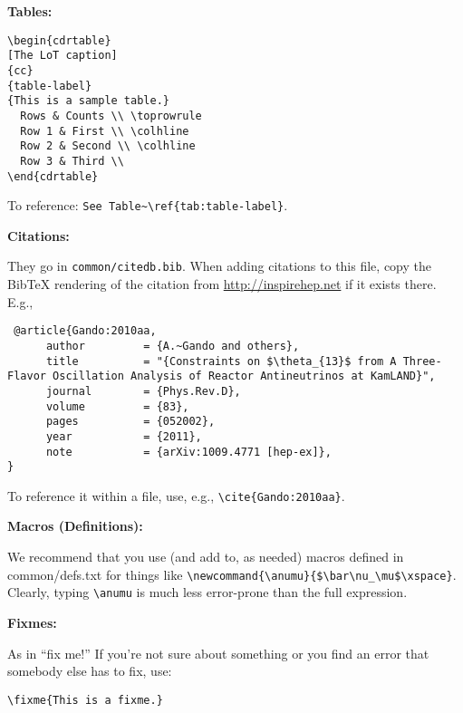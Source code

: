 \textbf{Tables:}
\begin{verbatim}
\begin{cdrtable}
[The LoT caption]
{cc}
{table-label}
{This is a sample table.}
  Rows & Counts \\ \toprowrule
  Row 1 & First \\ \colhline
  Row 2 & Second \\ \colhline
  Row 3 & Third \\ 
\end{cdrtable}
\end{verbatim}
To reference: \verb|See Table~\ref{tab:table-label}|.


\textbf{Citations:}

They go in \texttt{common/citedb.bib}. When adding citations to this file, copy the BibTeX rendering of the citation from \url{http://inspirehep.net} if it exists there. E.g.,

\begin{verbatim}
 @article{Gando:2010aa,
      author         = {A.~Gando and others},
      title          = "{Constraints on $\theta_{13}$ from A Three-Flavor Oscillation Analysis of Reactor Antineutrinos at KamLAND}",
      journal        = {Phys.Rev.D},
      volume         = {83},
      pages          = {052002},
      year           = {2011},
      note           = {arXiv:1009.4771 [hep-ex]},
}
\end{verbatim}

 To reference it within a file, use, e.g.,  \verb|\cite{Gando:2010aa}|.

\textbf{Macros (Definitions):}

We recommend that you use (and add to, as needed) macros defined in common/defs.txt for things like \verb|\newcommand{\anumu}{$\bar\nu_\mu$\xspace}|. Clearly, typing \verb|\anumu| is much less error-prone than the full expression.

\textbf{Fixmes:}

As in ``fix me!'' If you're not sure about something or you find an error that somebody else has to fix, use:
\begin{verbatim}
\fixme{This is a fixme.}
\end{verbatim}